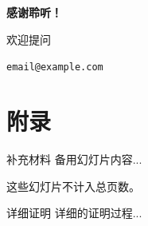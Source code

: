 \documentclass[aspectratio=169,11pt]{beamer}
\begin{document}
{
\begin{frame}
    \begin{center}
        {\Huge\bfseries 感谢聆听！}

        \vspace{2em}

        {\Large 欢迎提问}

        \vspace{2em}

        \texttt{email@example.com}
    \end{center}
\end{frame}
}

\appendix
\section*{附录}

\begin{frame}{补充材料}
    备用幻灯片内容...

    这些幻灯片不计入总页数。
\end{frame}

\begin{frame}{详细证明}
    详细的证明过程...
\end{frame}
\end{document}
